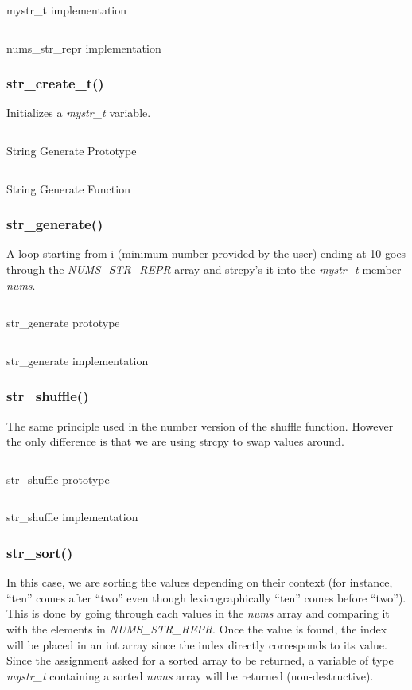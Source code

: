 \documentclass[a4paper, 12pt, titlepage]{article}
\newenvironment{code}{\captionsetup{type=listing}}{}
\newcommand{\sourcecode}[3]{
    \begin{code}
      \inputminted[linenos,numbersep=5pt,gobble=0,frame=lines,framesep=2mm,]{c}{#1}
        \caption{#2}
        \label{lst: #3}
    \end{code}
}
\begin{document}
\begin{onehalfspacing}
  \sourcecode{snippets/mystr_t.c}{mystr\_t implementation}{mystr_t}


  \sourcecode{snippets/nums_str_repr.c}{nums\_str\_repr implementation}{nums_str_repr}


  \subsubsection{str\_create\_t()}
  Initializes a \emph{mystr\_t} variable.
  \sourcecode{snippets/str_create_t_header.c}{String Generate Prototype}{str_generate_prototype}
  \sourcecode{snippets/str_create.c}{String Generate Function}{str_generate}

  \subsubsection{str\_generate()}
  A loop starting from i (minimum number provided by the user) ending at 10 goes through the \emph{NUMS\_STR\_REPR} array and strcpy's it into the \emph{mystr\_t} member \emph{nums}.
  \sourcecode{snippets/str_generate_header.c}{str\_generate prototype}{str_generate_header}
  \sourcecode{snippets/str_generate.c}{str\_generate implementation}{str_generate}

  \clearpage

  \subsubsection{str\_shuffle()}
  The same principle used in the number version of the shuffle function. However the only difference is that we are using strcpy to swap values around.

  \sourcecode{snippets/str_shuffle_header.c}{str\_shuffle prototype}{str_shuffle_prototype}
  \sourcecode{snippets/str_shuffle.c}{str\_shuffle implementation}{str_shuffle_implementation}

  \subsubsection{str\_sort()}
  In this case, we are sorting the values depending on their context (for instance, ``ten'' comes after ``two'' even though lexicographically ``ten'' comes before ``two''). This is done by going through each values in the \emph{nums} array and comparing it with the elements in \emph{NUMS\_STR\_REPR}. Once the value is found, the index will be placed in an int array since the index directly corresponds to its value. Since the assignment asked for a sorted array to be returned, a variable of type \emph{mystr\_t} containing a sorted \emph{nums} array will be returned (non-destructive).


\end{onehalfspacing}
\end{document}
